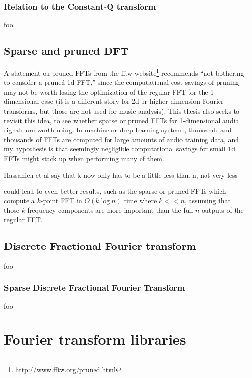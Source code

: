 \documentclass[letter,12pt]{article}
\begin{document}
\subsubsection{Relation to the Constant-Q transform}

foo

\subsection{Sparse and pruned DFT}


A statement on pruned FFTs from the fftw website\footnote{\href{http://www.fftw.org/pruned.html}{http://www.fftw.org/pruned.html}} recommends ``not bothering to consider a pruned 1d FFT,'' since the computational cost savings of pruning may not be worth losing the optimization of the regular FFT for the 1-dimensional case (it is a different story for 2d or higher dimension Fourier transforms, but those are not used for music analysis). This thesis also seeks to revisit this idea, to see whether sparse or pruned FFTs for 1-dimensional audio signals are worth using. In machine or deep learning systems, thousands and thousands of FFTs are computed for large amounts of audio training data, and my hypothesis is that seemingly negligible computational savings for small 1d FFTs might stack up when performing many of them.

Hassanieh et al say that k now only has to be a little less than n, not very less - 

 could lead to even better results, such as the sparse or pruned FFTs which compute a $k$-point FFT in $O(k \log n)$ time where $k << n$, assuming that those $k$ frequency components are more important than the full $n$ outputs of the regular FFT.



\subsection{Discrete Fractional Fourier transform}

foo

\subsubsection{Sparse Discrete Fractional Fourier Transform}

foo

\section{Fourier transform libraries}
\end{document}

